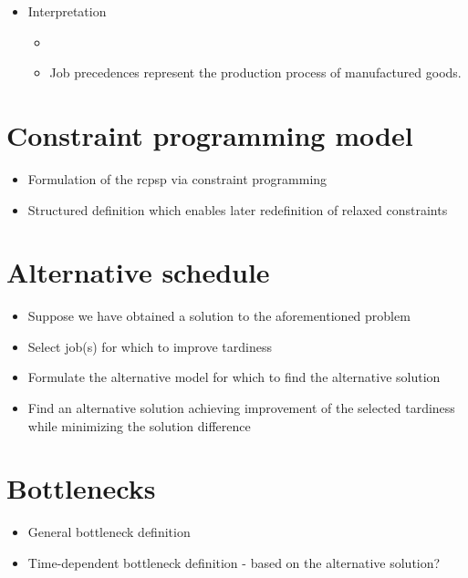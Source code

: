 \begin{itemize}
\begin{itemize}
        \item {}
    \end{itemize}

    \item Interpretation
    \begin{itemize}
        \item {}
        \item Job precedences represent the production process of manufactured goods.
    \end{itemize}
\end{itemize}

\section{Constraint programming model}

\begin{itemize}
    \item Formulation of the \ac{rcpsp} via constraint programming
    \item Structured definition which enables later redefinition of relaxed constraints
\end{itemize}

\section{Alternative schedule}

\begin{itemize}
    \item Suppose we have obtained a solution to the aforementioned problem
    \item Select job(s) for which to improve tardiness
    \item Formulate the alternative model for which to find the alternative solution
    \item Find an alternative solution achieving improvement of the selected tardiness while
        minimizing the solution difference
\end{itemize}

\section{Bottlenecks}

\begin{itemize}
    \item General bottleneck definition
    \item Time-dependent bottleneck definition - based on the alternative solution?
\end{itemize}

